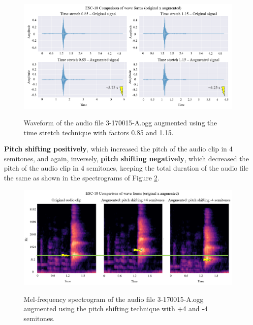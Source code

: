\begin{figure}[htbp]
    \raggedright
        \caption{Waveform of the audio file 3-170015-A.ogg augmented using the time stretch technique with factors 0.85 and 1.15.}
        \includegraphics[width=.98\textwidth]{resources/images/050-methods/Methods_augmentation_time_stretching.png}
        \label{fig:methods_augmentation_time_stretch}
\end{figure}

\textbf{Pitch shifting positively}, which increased the pitch of the audio clip in 4 semitones, and again, inversely, \textbf{pitch shifting negatively}, which decreased the pitch of the audio clip in 4 semitones, keeping the total duration of the audio file the same as shown in the spectrograms of Figure \ref{fig:methods_augmentation_pitch_shifting}. 

\begin{figure}[htbp]
    \raggedright
        \caption{Mel-frequency spectrogram of the audio file 3-170015-A.ogg augmented using the pitch shifting technique with +4 and -4 semitones.}
        \includegraphics[width=.98\textwidth]{resources/images/050-methods/Methods_augmentation_pitch_shifting.png}
        \label{fig:methods_augmentation_pitch_shifting}
\end{figure}

